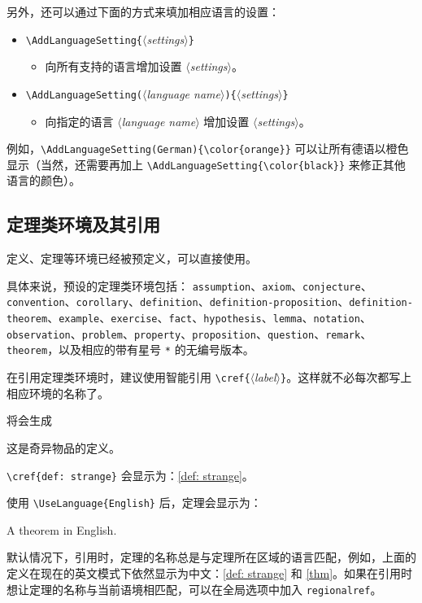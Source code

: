 \documentclass[Chinese,English,French,allowbf,puretext]{lebhart}
\theoremstyle{basic}
\theoremstyle{emphasis}
\theoremstyle{simple}
\providecommand{\meta}[1]{$\langle${\normalfont\itshape#1}$\rangle$}
\newenvironment{tip}[1][提示]{%
    \begin{tcolorbox}[breakable,
        enhanced,
        width = \textwidth,
        colback = paper, colbacktitle = paper,
        colframe = gray!50, boxrule=0.2mm,
        coltitle = black,
        fonttitle = \sffamily,
        attach boxed title to top left = {yshift=-\tcboxedtitleheight/2, xshift=.5cm},
        boxed title style = {boxrule=0pt, colframe=paper},
        before skip = 0.3cm,
        after skip = 0.3cm,
        top = 3mm,
        bottom = 3mm,
        title={\sffamily #1}]%
}{\end{tcolorbox}}
\begin{document}
\clearpage
另外，还可以通过下面的方式来填加相应语言的设置：
\begin{itemize}
    \item \lstinline|\AddLanguageSetting{|\meta{settings}\lstinline|}|
    \begin{itemize}
        \item 向所有支持的语言增加设置 \meta{settings}。
    \end{itemize}
    \item \lstinline|\AddLanguageSetting(|\meta{language name}\lstinline|){|\meta{settings}\lstinline|}|
    \begin{itemize}
        \item 向指定的语言 \meta{language name} 增加设置 \meta{settings}。
    \end{itemize}
\end{itemize}
例如，\lstinline|\AddLanguageSetting(German){\color{orange}}| 可以让所有德语以橙色显示（当然，还需要再加上 \lstinline|\AddLanguageSetting{\color{black}}| 来修正其他语言的颜色）。

\medskip
\subsection{定理类环境及其引用}

定义、定理等环境已经被预定义，可以直接使用。

具体来说，预设的定理类环境包括：
\texttt{assumption}、\texttt{axiom}、\texttt{conjecture}、\texttt{convention}、\texttt{corollary}、\texttt{definition}、\texttt{definition-proposition}、\texttt{definition-theorem}、\texttt{example}、\texttt{exercise}、\texttt{fact}、\texttt{hypothesis}、\texttt{lemma}、\texttt{notation}、\texttt{observation}、\texttt{problem}、\texttt{property}、\texttt{proposition}、\texttt{question}、\texttt{remark}、\texttt{theorem}，以及相应的带有星号 \lstinline|*| 的无编号版本。

\medskip
在引用定理类环境时，建议使用智能引用 \lstinline|\cref{|\meta{label}\lstinline|}|。这样就不必每次都写上相应环境的名称了。

\begin{tip}[例子]

\lstinline|\cref{def: strange}| 会显示为：\cref{def: strange}。

\medskip
使用 \lstinline|\UseLanguage{English}| 后，定理会显示为：

\begin{theorem}[Useless]\label{thm}
    A theorem in English.
\end{theorem}

默认情况下，引用时，定理的名称总是与定理所在区域的语言匹配，例如，上面的定义在现在的英文模式下依然显示为中文：\cref{def: strange} 和 \cref{thm}。如果在引用时想让定理的名称与当前语境相匹配，可以在全局选项中加入 \texttt{regionalref}。
\end{tip}
\end{document}
